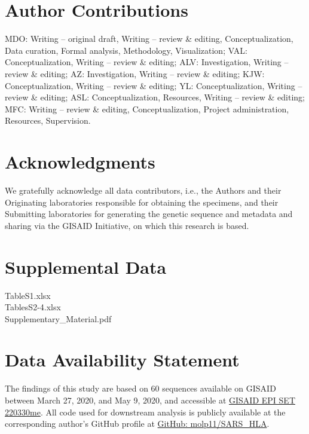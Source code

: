 \documentclass[utf8]{frontiersinFPHY_FAMS} %
\begin{document}
\section*{Author Contributions}
MDO: Writing – original draft, Writing – review \& editing, Conceptualization, Data curation, Formal analysis, Methodology, Visualization; VAL: Conceptualization, Writing – review \& editing; ALV: Investigation, Writing – review \& editing; AZ: Investigation, Writing – review \& editing; KJW: Conceptualization, Writing – review \& editing; YL: Conceptualization, Writing – review \& editing; ASL: Conceptualization, Resources, Writing – review \& editing; MFC: Writing – review \& editing, Conceptualization, Project administration, Resources, Supervision.

\section*{Acknowledgments}
We gratefully acknowledge all data contributors, i.e., the Authors and their Originating laboratories responsible for obtaining the specimens, and their Submitting laboratories for generating the genetic sequence and metadata and sharing via the GISAID Initiative, on which this research is based. 

\section*{Supplemental Data}
TableS1.xlsx\\
TablesS2-4.xlsx\\
Supplementary\_Material.pdf

\section*{Data Availability Statement}
The findings of this study are based on 60 sequences available on GISAID between March 27, 2020, and May 9, 2020, and accessible at \href{https://gisaid.org/EPI_SET_220330me}{GISAID EPI SET 220330me}. All code used for downstream analysis is publicly available at the corresponding author's GitHub profile at \href{https://github.com/molp11/SARS_HLA}{GitHub: molp11/SARS\_HLA}.




\end{document}

